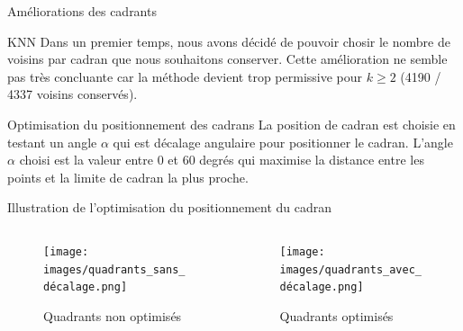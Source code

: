 \begin{frame}{Améliorations des cadrants}
    \begin{block}{KNN}
        Dans un premier temps, nous avons décidé de pouvoir chosir le nombre de voisins par cadran que nous souhaitons conserver.
        Cette amélioration ne semble pas très concluante car la méthode devient trop permissive pour $k \geq 2$ (4190 / 4337 voisins conservés).
    \end{block}
    \begin{block}{Optimisation du positionnement des cadrans}
        La position de cadran est choisie en testant un angle $\alpha$ qui est décalage angulaire pour positionner le cadran.
        L'angle $\alpha$ choisi est la valeur entre 0 et 60 degrés qui maximise la distance entre les points et la limite de cadran la plus proche.
    \end{block}
\end{frame}

\begin{frame}{Illustration de l'optimisation du positionnement du cadran}
    \begin{columns}
        \begin{column}{0.5\textwidth}
            \begin{figure}
                \texttt{[image: images/quadrants\_sans\_décalage.png]}
                \caption{\label{fig:quad_sans_decalage} Quadrants non optimisés}
            \end{figure}
        \end{column}
        \begin{column}{0.5\textwidth}
            \begin{figure}
                \texttt{[image: images/quadrants\_avec\_décalage.png]}
                \caption{\label{fig:quad_avec_decalage} Quadrants optimisés}
            \end{figure}
        \end{column}
    \end{columns}
\end{frame}

